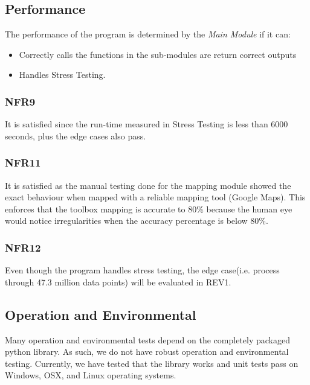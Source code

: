 \documentclass[12pt, titlepage]{article}
\begin{document}
\subsection{Performance}
The performance of the program is determined by the \emph{Main Module} if it can:
\begin{itemize}
    \item Correctly calls the functions in the sub-modules are return correct outputs
    \item Handles Stress Testing.
\end{itemize}

\subsubsection{NFR9}
It is satisfied since the run-time measured in Stress Testing is less than 6000 seconds, plus the edge cases also pass.
\subsubsection{NFR11}
It is satisfied as the manual testing done for the mapping module showed the exact behaviour when mapped with a reliable mapping tool (Google Maps). This enforces that the toolbox mapping is accurate to 80\% because the human eye would notice irregularities when the accuracy percentage is below 80\%. 
\subsubsection{NFR12}
Even though the program handles stress testing, the edge case(i.e. process through 47.3 million data points) will be evaluated in REV1.
\subsection{Operation and Environmental}
Many operation and environmental tests depend on the completely packaged python library. As such, we do not have robust operation and environmental testing. Currently, we have tested that the library works and unit tests pass on Windows, OSX, and Linux operating systems.
\end{document}
